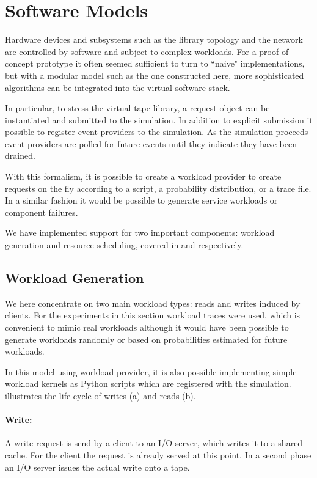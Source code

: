 \documentclass{../../template/esiwace-report}
\begin{document}
\section{Software Models}

Hardware devices and subsystems such as the library topology and the network are controlled by software and subject to complex workloads.  For a proof of concept prototype it often seemed sufficient to turn to ``naive" implementations, but
with a modular model such as the one constructed here,  more sophisticated algorithms can be integrated into the virtual software stack.

In particular, to stress the virtual tape library, a request object can be instantiated and submitted to the simulation.
In addition to explicit submission it possible to register event providers to the simulation.
As the simulation proceeds event providers are polled for future events until they indicate they have been drained.

With this formalism, it is possible to create a workload provider to create requests on the fly according to a script, a probability distribution, or a trace file. In a similar fashion it would be possible to generate service workloads or component failures.

We have implemented support for two important components: workload generation and resource scheduling, covered in  and  respectively. 

\subsection{Workload Generation}
\label{sec:refined/workloads}

We here concentrate on two main workload types: reads and writes induced by clients. For the experiments in this section workload traces were used, which is convenient to mimic real workloads although it would have been 
  possible to generate workloads randomly or based on probabilities estimated
  for future workloads.
  
In this model using workload provider, it is also possible implementing simple workload kernels as Python scripts which are registered with the simulation.
 illustrates the life cycle of writes (a) and reads (b).

\paragraph{Write:}
A write request is send by a client to an I/O server, which writes it to a shared cache.
For the client the request is already served at this point.
In a second phase an I/O server issues the actual write onto a tape.
\end{document}
